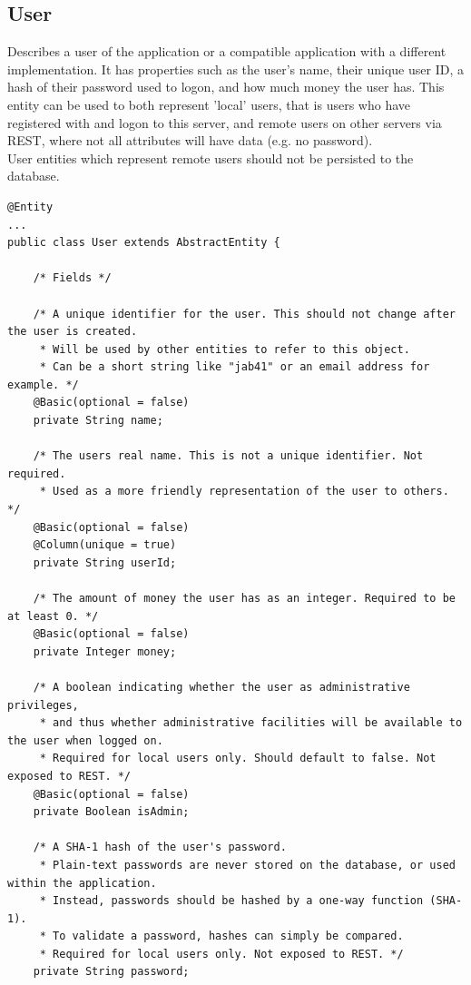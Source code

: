\subsection{User}
Describes a user of the application or a compatible application with a different implementation. It has properties such as the user's name, their unique user ID, a hash of their password used to logon, and how much money the user has. This entity can be used to both represent 'local' users, that is users who have registered with and logon to this server, and remote users on other servers via REST, where not all attributes will have data (e.g. no password).
\\User entities which represent remote users should not be persisted to the database.
\begin{small}\begin{verbatim}
@Entity
...
public class User extends AbstractEntity {
    
    /* Fields */
    
    /* A unique identifier for the user. This should not change after the user is created.
     * Will be used by other entities to refer to this object.
     * Can be a short string like "jab41" or an email address for example. */
    @Basic(optional = false)
    private String name;
    
    /* The users real name. This is not a unique identifier. Not required.
     * Used as a more friendly representation of the user to others. */
    @Basic(optional = false)
    @Column(unique = true)
    private String userId;
    
    /* The amount of money the user has as an integer. Required to be at least 0. */
    @Basic(optional = false)
    private Integer money;
    
    /* A boolean indicating whether the user as administrative privileges,
     * and thus whether administrative facilities will be available to the user when logged on.
     * Required for local users only. Should default to false. Not exposed to REST. */
    @Basic(optional = false)
    private Boolean isAdmin;
    
    /* A SHA-1 hash of the user's password.
     * Plain-text passwords are never stored on the database, or used within the application.
     * Instead, passwords should be hashed by a one-way function (SHA-1).
     * To validate a password, hashes can simply be compared.
     * Required for local users only. Not exposed to REST. */
    private String password;
    

\end{verbatim}
\end{small}
